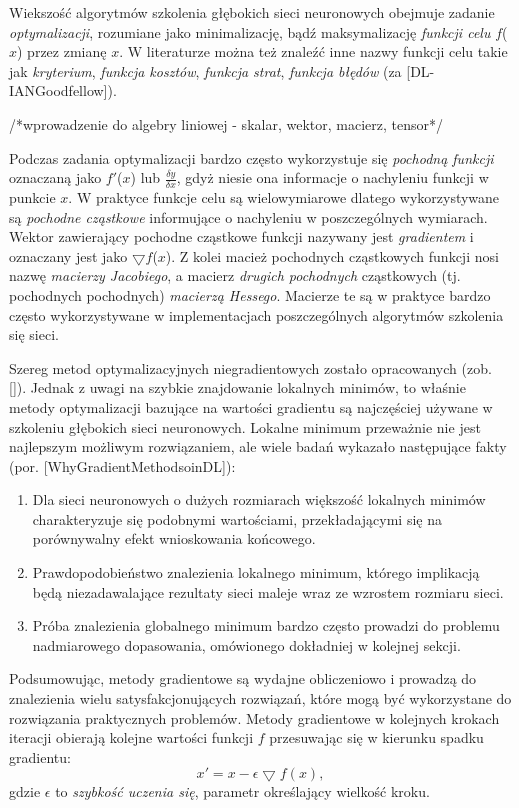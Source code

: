 Wiekszość algorytmów szkolenia głębokich sieci neuronowych obejmuje zadanie \textit{optymalizacji}, rozumiane jako minimalizację, bądź maksymalizację \textit{funkcji celu} $f$($x$) przez zmianę $x$. W literaturze można też znaleźć inne nazwy funkcji celu takie jak \textit{kryterium}, \textit{funkcja kosztów}, \textit{funkcja strat}, \textit{funkcja błędów} (za [DL-IANGoodfellow]). 

/*wprowadzenie do algebry liniowej - skalar, wektor, macierz, tensor*/

Podczas zadania optymalizacji bardzo często wykorzystuje się \textit{pochodną funkcji} oznaczaną jako $f'$($x$) lub $\frac{\delta y}{\delta x}$, gdyż niesie ona informacje o nachyleniu funkcji w punkcie $x$. W praktyce funkcje celu są wielowymiarowe dlatego wykorzystywane są \textit{pochodne cząstkowe} informujące o nachyleniu w poszczególnych wymiarach. Wektor zawierający pochodne cząstkowe funkcji nazywany jest \textit{gradientem} i oznaczany jest jako $\bigtriangledown f$($x$). Z kolei macież pochodnych cząstkowych funkcji nosi nazwę \textit{macierzy Jacobiego}, a macierz \textit{drugich pochodnych} cząstkowych (tj. pochodnych pochodnych) \textit{macierzą Hessego}. Macierze te są w praktyce bardzo często wykorzystywane w implementacjach poszczególnych algorytmów szkolenia się sieci.

Szereg metod optymalizacyjnych niegradientowych zostało opracowanych (zob. []). Jednak z uwagi na szybkie znajdowanie lokalnych minimów, to właśnie metody optymalizacji bazujące na wartości gradientu są najczęściej używane w szkoleniu głębokich sieci neuronowych. Lokalne minimum przeważnie nie jest najlepszym możliwym rozwiązaniem, ale wiele badań wykazało następujące fakty (por. [WhyGradientMethodsoinDL]):
\begin{enumerate}
	\item Dla sieci neuronowych o dużych rozmiarach większość lokalnych minimów charakteryzuje się podobnymi wartościami, przekładającymi się na porównywalny efekt wnioskowania końcowego.
	\item Prawdopodobieństwo znalezienia lokalnego minimum, którego implikacją będą niezadawalające rezultaty sieci maleje wraz ze wzrostem rozmiaru sieci.
	\item Próba znalezienia globalnego minimum bardzo często prowadzi do problemu nadmiarowego dopasowania, omówionego dokładniej w kolejnej sekcji.
\end{enumerate}

Podsumowując, metody gradientowe są wydajne obliczeniowo i prowadzą do znalezienia wielu satysfakcjonujących rozwiązań, które mogą być wykorzystane do rozwiązania praktycznych problemów. Metody gradientowe w kolejnych krokach iteracji obierają kolejne wartości funkcji $f$ przesuwając się w kierunku spadku gradientu:
\begin{equation}
x' = x - \epsilon \bigtriangledown f(x),
\end{equation} 
gdzie $\epsilon$ to \textit{szybkość uczenia się}, parametr określający wielkość kroku. 

